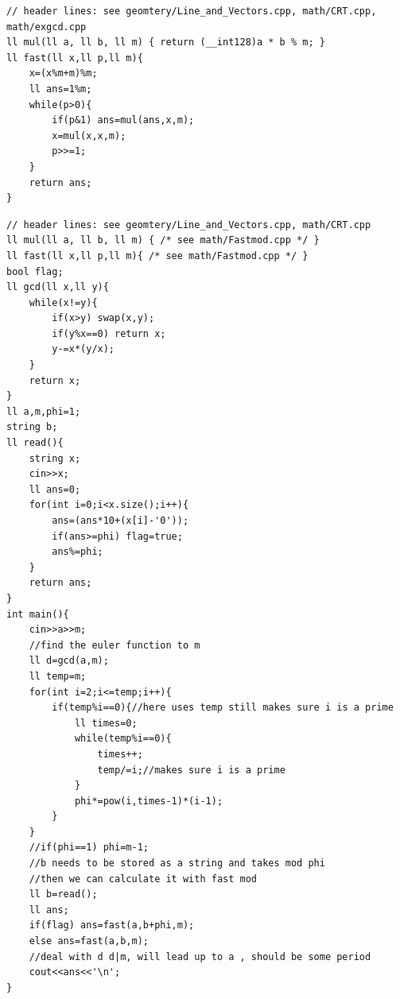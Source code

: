 
\begin{lstlisting}[breaklines=true]
// header lines: see geomtery/Line_and_Vectors.cpp, math/CRT.cpp, math/exgcd.cpp
ll mul(ll a, ll b, ll m) { return (__int128)a * b % m; }
ll fast(ll x,ll p,ll m){
    x=(x%m+m)%m;
    ll ans=1%m;
    while(p>0){
        if(p&1) ans=mul(ans,x,m);
        x=mul(x,x,m);
        p>>=1;
    }
    return ans;
}
\end{lstlisting}


\begin{lstlisting}[breaklines=true]
// header lines: see geomtery/Line_and_Vectors.cpp, math/CRT.cpp
ll mul(ll a, ll b, ll m) { /* see math/Fastmod.cpp */ }
ll fast(ll x,ll p,ll m){ /* see math/Fastmod.cpp */ }
bool flag;
ll gcd(ll x,ll y){
    while(x!=y){
        if(x>y) swap(x,y);
        if(y%x==0) return x;
        y-=x*(y/x);
    }
    return x;
}
ll a,m,phi=1;
string b;
ll read(){
    string x;
    cin>>x;
    ll ans=0;
    for(int i=0;i<x.size();i++){
        ans=(ans*10+(x[i]-'0'));
        if(ans>=phi) flag=true;
        ans%=phi;
    }
    return ans;
}
int main(){
    cin>>a>>m;
    //find the euler function to m
    ll d=gcd(a,m);
    ll temp=m;
    for(int i=2;i<=temp;i++){
        if(temp%i==0){//here uses temp still makes sure i is a prime
            ll times=0;
            while(temp%i==0){
                times++;
                temp/=i;//makes sure i is a prime
            }
            phi*=pow(i,times-1)*(i-1);
        }
    }
    //if(phi==1) phi=m-1;
    //b needs to be stored as a string and takes mod phi
    //then we can calculate it with fast mod
    ll b=read();
    ll ans;
    if(flag) ans=fast(a,b+phi,m);
    else ans=fast(a,b,m);
    //deal with d d|m, will lead up to a , should be some period
    cout<<ans<<'\n';
}
\end{lstlisting}


